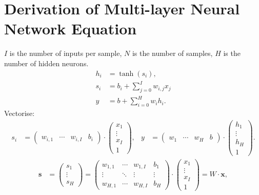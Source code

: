 \chapter{Derivation of Multi-layer Neural Network Equation}\label{app:BHMDeriv}
$I$ is the number of inputs per sample,
$N$ is the number of samples,
$H$ is the number of hidden neurons.
\begin{align*}
    h_i &= \tanh(s_i),\\
    s_i &= b_i + \sum_{j=0}^{I} w_{i,j} x_j\\
    y &= b + \sum_{i=0}^{H} w_i h_i.
\end{align*}
Vectorise:
\begin{align*}
    s_i &=
        \begin{pmatrix}
            w_{i,1} & \cdots & w_{i,I} & b_i
        \end{pmatrix}
        \cdot
        \begin{pmatrix}
            x_1 \\ \vdots \\ x_I \\ 1
        \end{pmatrix},
    &
    y &=
        \begin{pmatrix}
            w_1 & \cdots & w_H & b
        \end{pmatrix}
        \cdot
        \begin{pmatrix}
            h_1 \\ \vdots \\ h_H \\ 1
        \end{pmatrix}.
\end{align*}
\begin{align*}
    \mathbf{s} &= \begin{pmatrix} s_1 \\ \vdots \\ s_H \end{pmatrix}
    =
    \begin{pmatrix}
        w_{1,1} & \cdots & w_{1,I} & b_1\\
        \vdots  & \ddots & \vdots  & \vdots\\
        w_{H,1} & \cdots & w_{H,I} & b_H
    \end{pmatrix}
    \cdot
    \begin{pmatrix}
        x_1 \\ \vdots \\ x_I \\ 1
    \end{pmatrix}
    = W\cdot\mathbf{x},
\end{align*}
